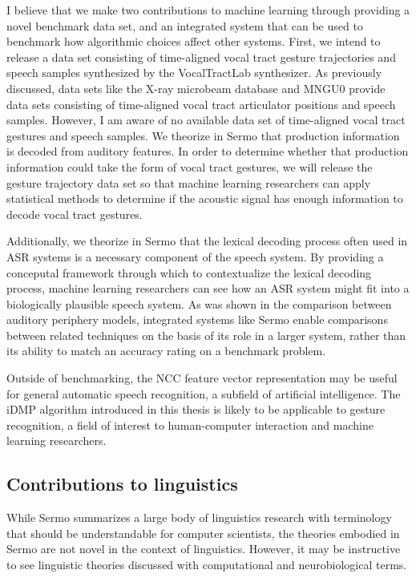 I believe that we make two contributions
to machine learning through
providing a novel benchmark data set,
and an integrated system that can
be used to benchmark how algorithmic choices
affect other systems.
First, we intend to release a data set
consisting of time-aligned
vocal tract gesture trajectories
and speech samples synthesized
by the VocalTractLab synthesizer.
As previously discussed,
data sets like the
X-ray microbeam database \citep{westbury1990}
and MNGU0 \citep{steiner2012}
provide data sets
consisting of time-aligned
vocal tract articulator positions
and speech samples.
However, I am aware of no available data set
of time-aligned vocal tract gestures
and speech samples.
We theorize in Sermo
that production information
is decoded from auditory features.
In order to determine whether
that production information
could take the form of vocal tract gestures,
we will release the
gesture trajectory data set
so that machine learning researchers
can apply statistical methods
to determine if the acoustic signal
has enough information to decode
vocal tract gestures.

Additionally, we theorize in Sermo
that the lexical decoding process
often used in ASR systems
is a necessary component
of the speech system.
By providing a conceputal framework
through which to contextualize
the lexical decoding process,
machine learning researchers can
see how an ASR system might fit into
a biologically plausible speech system.
As was shown in the comparison
between auditory periphery models,
integrated systems like Sermo
enable comparisons between related techniques
on the basis of its role in a larger system,
rather than its ability to match
an accuracy rating on a benchmark problem.

Outside of benchmarking, the NCC
feature vector representation
may be useful for
general automatic speech recognition,
a subfield of artificial intelligence.
The iDMP algorithm
introduced in this thesis is likely to be
applicable to gesture recognition,
a field of interest to human-computer interaction
and machine learning researchers.

\subsection{Contributions to linguistics}

While Sermo summarizes a large body of
linguistics research with terminology
that should be understandable for
computer scientists,
the theories embodied in Sermo
are not novel in the context of linguistics.
However, it may be instructive to see
linguistic theories
discussed with computational
and neurobiological terms.

